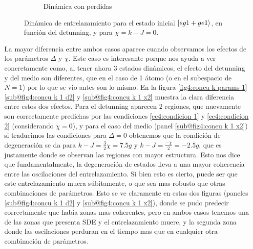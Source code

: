 \begin{figure}[h!]
\begin{subfigure}{0.49\textwidth}
        \caption{Dinámica con perdidas}
        \label{fig4:concu k 1 dis}
    \end{subfigure}
    \caption{Dinámica de entrelazamiento para el estado inicial $\ket{eg1+ge1}$, en función del detunning, y para $\chi=k-J=0$.}
    \label{fig4:concu k 1}
\end{figure}
La mayor diferencia entre ambos casos aparece cuando observamos los efectos de los parámetros $\Delta$ y $\chi$. Este caso es interesante porque nos ayuda a ver concretamente como, al tener ahora 3 estados dinámicos, el efecto del detunning y del medio son diferentes, que en el caso de 1 átomo (o en el subespacio de $N=1$) por lo que se vio antes son lo mismo. En la figura \ref{fig4:concu k params 1}\ref{sub@fig4:concu k 1 d2} y \ref{sub@fig4:concu k 1 x2} muestra la clara diferencia entre estos dos efectos. Para el detunning aparecen 2 regiones, que nuevamente son correctamente predichas por las condiciones \ref{ec4:condicion 1} y \ref{ec4:condicion 2} (considerando $\chi=0$), y para el caso del medio (panel \ref{sub@fig4:concu k 1 x2}) si traducimos las condiciones para $\Delta=0$ obtenemos que la condición de degeneración se da para $k-J=\frac{3}{2}\chi=7.5g$ y $k-J=\frac{-\chi}{2}=-2.5g$, que es justamente donde se observan las regiones con mayor estructura.
Esto nos dice que fundamentalmente, la degeneración de estados lleva a una mayor coherencia entre las oscilaciones del entrelazamiento. Si bien esto es cierto, puede ser que este entrelazamiento muera súbitamente, o que sea mas robusto que otras combinaciones de parámetros. Esto se ve claramente en estas dos figuras (paneles \ref{sub@fig4:concu k 1 d2} y \ref{sub@fig4:concu k 1 x2}), donde se pudo predecir correctamente que había zonas mas coherentes, pero en ambos casos tenemos una de las zonas que presenta SDE y el entrelazamiento muere, y la segunda zona donde las oscilaciones perduran en el tiempo mas que en cualquier otra combinación de parámetros. 
